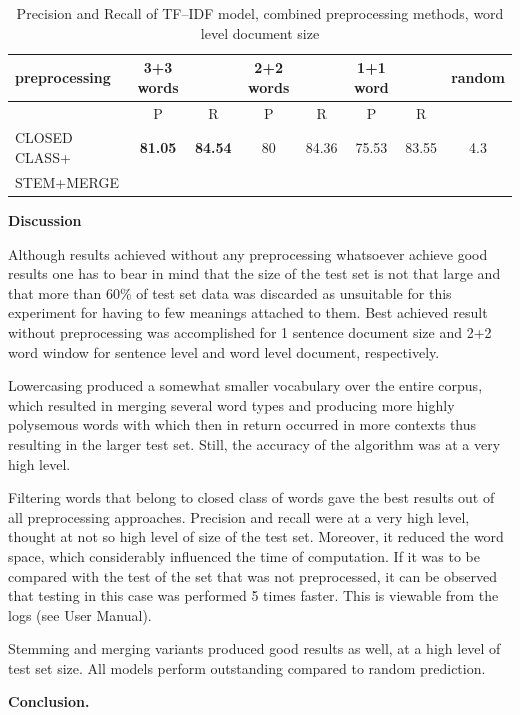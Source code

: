 \begin{table}[h!]
\begin{tabular}{ l | c c | c c | c c | c}
   preprocessing &  3+3 words && 2+2 words && 1+1 word  && random\\
\hline\hline
	& P  &  R & P  &  R & P  &  R &\\
\hline
CLOSED CLASS+ & \textbf{81.05}  & \textbf{84.54}  & 80  & 84.36  & 75.53 & 83.55  & 4.3\\
STEM+MERGE &&&&&&&\\
\end{tabular}
\caption{Precision and Recall of TF--IDF model,  combined preprocessing methods, word level document size}
\end{table} 

\vspace{10 mm}
\textbf{Discussion}

Although results achieved without any preprocessing whatsoever achieve good results one has to bear
in mind that the size of the test set is not that large and that more than 60\% of test set data was 
discarded as unsuitable for this experiment for having to few meanings attached to them. Best achieved result without preprocessing was 
accomplished for 1 sentence document size and 2+2 word window for sentence level and word level document, respectively. 

Lowercasing produced a somewhat smaller vocabulary over the entire corpus, which resulted in merging 
several word types and producing more highly polysemous words with which then in return occurred in 
more contexts thus resulting in the larger test set. Still, the accuracy of the algorithm was at a very high 
level.

Filtering words that belong to closed class of words gave the best results out of all preprocessing 
approaches. Precision and recall were at a very high level, thought at not so high level of size of the test set. 
Moreover, it reduced the word space, which considerably influenced the time of computation. If it was to
be compared with the test of the set that was not preprocessed, it can be observed that testing in this 
case was performed 5 times faster. This is viewable from the logs (see User Manual).

Stemming and merging variants produced good results as well, at a high level of test set size. 
All models perform outstanding compared to random prediction. 

\vspace{10 mm}
\textbf{Conclusion.} 

